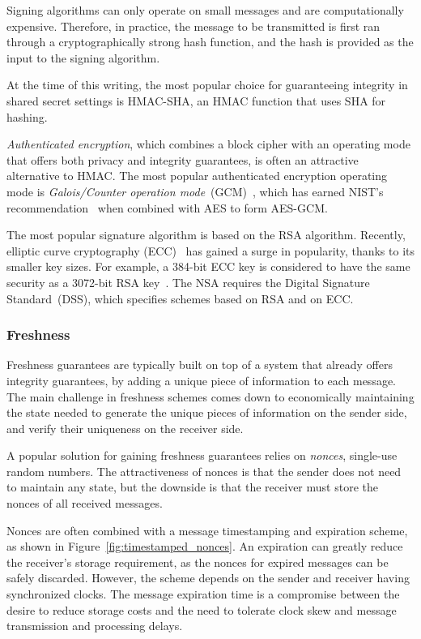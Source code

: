Signing algorithms can only operate on small messages and are computationally
expensive. Therefore, in practice, the message to be transmitted is first ran
through a cryptographically strong hash function, and the hash is provided as
the input to the signing algorithm.

At the time of this writing, the most popular choice for guaranteeing integrity
in shared secret settings is HMAC-SHA, an HMAC function that uses SHA for
hashing.

\textit{Authenticated encryption}, which combines a block cipher with an
operating mode that offers both privacy and integrity guarantees, is often an
attractive alternative to HMAC. The most popular authenticated encryption
operating mode is \textit{Galois/Counter operation
mode}~(GCM)~\cite{mcgrew2004gcm}, which has earned NIST's
recommendation~\cite{fips2017gcm} when combined with AES to form AES-GCM.

The most popular signature algorithm is based on the RSA algorithm. Recently,
elliptic curve cryptography (ECC)~\cite{koblitz1987ecc} has gained a surge in
popularity, thanks to its smaller key sizes. For example, a 384-bit ECC key is
considered to have the same security as a 3072-bit RSA
key~\cite{fips2012keysize, nsa2015suiteb}. The NSA requires the Digital
Signature Standard~(DSS)\cite{fips2013dss}, which specifies schemes based on
RSA and on ECC.


\subsubsection{Freshness}
\label{sec:freshness_crypto}

Freshness guarantees are typically built on top of a system that already offers
integrity guarantees, by adding a unique piece of information to each message.
The main challenge in freshness schemes comes down to economically maintaining
the state needed to generate the unique pieces of information on the sender
side, and verify their uniqueness on the receiver side.

A popular solution for gaining freshness guarantees relies on \textit{nonces},
single-use random numbers. The attractiveness of nonces is that the sender does
not need to maintain any state, but the downside is that the receiver must
store the nonces of all received messages.

Nonces are often combined with a message timestamping and expiration scheme, as
shown in Figure~\ref{fig:timestamped_nonces}. An expiration can greatly reduce
the receiver's storage requirement, as the nonces for expired messages can be
safely discarded. However, the scheme depends on the sender and receiver having
synchronized clocks. The message expiration time is a compromise between the
desire to reduce storage costs and the need to tolerate clock skew and
message transmission and processing delays.

